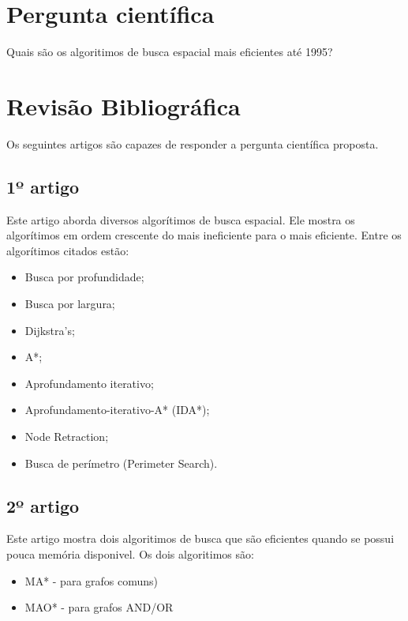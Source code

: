 \documentclass[a4paper]{article}
\begin{document}

\section{Pergunta científica}

Quais são os algoritimos de busca espacial mais eficientes até 1995?


\section{Revisão Bibliográfica}
Os seguintes artigos são capazes de responder a pergunta científica proposta.
\vspace{3mm}

\subsection{1º artigo}

Este artigo \cite{Korf1995} aborda diversos algorítimos de busca espacial. Ele mostra os algorítimos em ordem crescente do mais ineficiente para o mais eficiente. Entre os algorítimos citados estão:

\begin{itemize}

\item Busca por profundidade;
\item Busca por largura;
\item Dijkstra's;
\item A*;
\item Aprofundamento iterativo;
\item Aprofundamento-iterativo-A* (IDA*);
\item Node Retraction;
\item Busca de perímetro (Perimeter Search).

\end{itemize}

\subsection{2º artigo}

Este artigo \cite{Chakrabarti1989} mostra dois algoritimos de busca que são eficientes
quando se possui pouca memória disponivel. Os dois algoritimos são:

\begin{itemize}

\item MA* - para grafos comuns)
\item MAO* - para grafos AND/OR

\end{itemize}
\end{document}
